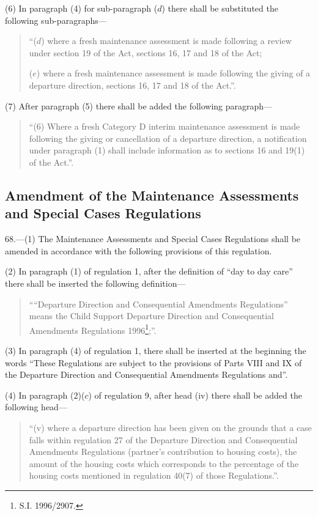 \documentclass[a4paper]{article}
\begin{document}
(6) In paragraph (4) for sub-paragraph ($d$) there shall be substituted the
following sub-paragraphs—
\begin{quotation}
“($d$) where a fresh maintenance assessment is made following a review under
section 19 of the Act, sections 16, 17 and 18 of the Act;

($e$) where a fresh maintenance assessment is made following the giving of a
departure direction, sections 16, 17 and 18 of the Act.”.
\end{quotation}

(7) After paragraph (5) there shall be added the following paragraph—
\begin{quotation}
“(6) Where a fresh Category D interim maintenance assessment is made following
the giving or cancellation of a departure direction, a notification under
paragraph (1) shall include information as to sections 16 and 19(1) of the
Act.”.
\end{quotation}

\subsection[68. Amendment of the Maintenance Assessments and Special Cases Regulations]{\sloppy Amendment of the Maintenance Assessments and Special Cases Regulations}

68.—(1)
The Maintenance Assessments and Special Cases Regulations shall be amended in
accordance with the following provisions of this regulation.

(2) In paragraph (1) of regulation 1, after the definition of “day to day care”
there shall be inserted the following definition—
\begin{quotation}
““Departure Direction and Consequential Amendments Regulations” means the Child
Support Departure Direction and Consequential Amendments Regulations 1996\footnote{\frenchspacing S.I. 1996/2907.};”.
\end{quotation}

(3) In paragraph (4) of regulation 1, there shall be inserted at the beginning
the words “These Regulations are subject to the provisions of Parts VIII and IX
of the Departure Direction and Consequential Amendments Regulations and”.

(4) In paragraph (2)($c$) of regulation 9, after head (iv) there shall be added
the following head—
\begin{quotation}
“(v) where a departure direction has been given on the grounds that a case falls
within regulation 27 of the Departure Direction and Consequential Amendments
Regulations (partner’s contribution to housing costs), the amount of the housing
costs which corresponds to the percentage of the housing costs mentioned in
regulation 40(7) of those Regulations.”.
\end{quotation}
\end{document}
